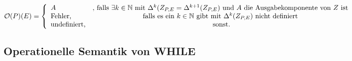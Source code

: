 $\mathcal{O}(P)(E)=\left\lbrace\begin{array}{l c} A&\text{, falls }\exists k\in\mathbb{N} \text{ mit } \Delta^k(Z_{P,E}=\Delta^{k+1}(Z_{P,E})\text{ und }A\text{ die Ausgabekomponente von }Z\text{ ist}\\
\text{Fehler,}& \text{falls es ein }k\in\mathbb{N}\text{ gibt mit }\Delta^k(Z_{P,E}) \text{ nicht definiert}\\
\text{undefiniert,}&\text{ sonst.}\\
\end{array}\right.$

\subsection{Operationelle Semantik von WHILE}
